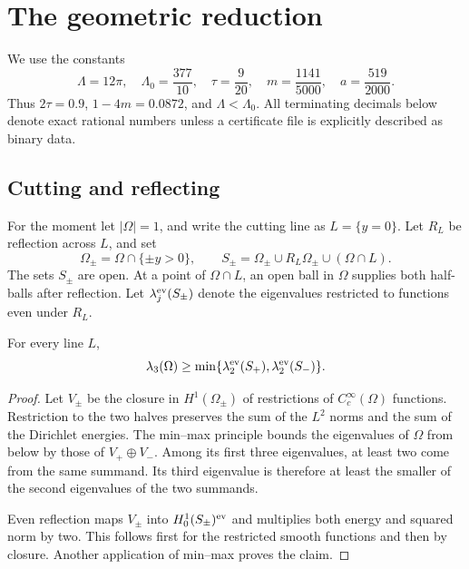 \section{The geometric reduction}\label{sec:geometry}
We use the constants
\begin{equation}\label{eq:constants}
 \Lambda=12\pi,\quad \Lambda_0=\frac{377}{10},\quad
 \tau=\frac9{20},\quad m=\frac{1141}{5000},\quad a=\frac{519}{2000}.
\end{equation}
Thus $2\tau=0.9$, $1-4m=0.0872$, and $\Lambda<\Lambda_0$. All terminating decimals below denote exact rational numbers unless a certificate file is explicitly described as binary data.

\subsection{Cutting and reflecting}
For the moment let $|\Omega|=1$, and write the cutting line as $L=\{y=0\}$. Let $R_L$ be reflection across $L$, and set
\[
 \Omega_\pm=\Omega\cap\{\pm y>0\},\qquad
 S_\pm=\Omega_\pm\cup R_L\Omega_\pm\cup(\Omega\cap L).
\]
The sets $S_\pm$ are open. At a point of $\Omega\cap L$, an open ball in $\Omega$ supplies both half-balls after reflection. Let $\lambda_j^{\mathrm{ev}}(S_\pm)$ denote the eigenvalues restricted to functions even under $R_L$.

\begin{lemma}\label{lem:bracket}
For every line $L$,
\[
 \lambda_3(\Omega)\ge
 \min\{\lambda_2^{\mathrm{ev}}(S_+),\lambda_2^{\mathrm{ev}}(S_-)\}.
\]
\end{lemma}
\begin{proof}
Let $V_\pm$ be the closure in $H^1(\Omega_\pm)$ of restrictions of $C_c^\infty(\Omega)$ functions. Restriction to the two halves preserves the sum of the $L^2$ norms and the sum of the Dirichlet energies. The min--max principle bounds the eigenvalues of $\Omega$ from below by those of $V_+\oplus V_-$. Among its first three eigenvalues, at least two come from the same summand. Its third eigenvalue is therefore at least the smaller of the second eigenvalues of the two summands.

Even reflection maps $V_\pm$ into $H^1_0(S_\pm)^{\mathrm{ev}}$ and multiplies both energy and squared norm by two. This follows first for the restricted smooth functions and then by closure. Another application of min--max proves the claim.
\end{proof}

